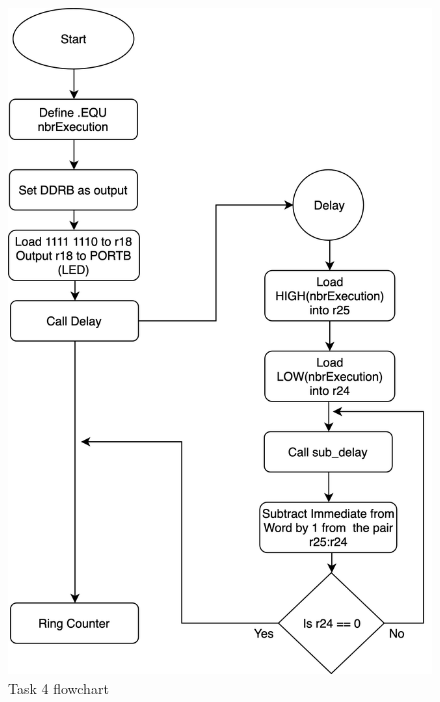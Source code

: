\documentclass[a4paper,12pt]{article}
\begin{document}
\break
\begin{figure}
\begin{center}
\includegraphics[width=\textwidth/1 ]{flowchart/task4_flowchart.png}
\end{center}
\caption{Task 4 flowchart}
\label{task4}
\end{figure}

\break 



\end{document}
